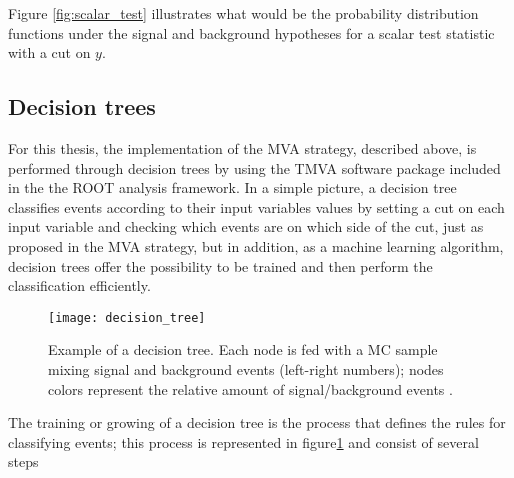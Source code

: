 Figure \ref{fig:scalar_test} illustrates what would be the probability distribution functions under the signal and background hypotheses for a scalar test statistic with a cut on $y$.

\subsection{Decision trees }

For this thesis, the implementation of the MVA strategy, described above, is performed through decision trees by using the TMVA software package \cite{tmva} included in the the ROOT analysis framework\cite{root}. In a simple picture, a decision tree classifies events according to their input variables values by setting a cut on each input variable and checking which events are on which side of the cut, just as proposed in the MVA strategy, but in addition, as a machine learning algorithm, decision trees offer the possibility to be trained and then perform the classification efficiently.    

\begin{figure}[!h]
  \centering
  \texttt{[image: decision\_tree]}
  \caption[Decision tree.]{Example of a decision tree. Each node is fed with a MC sample mixing signal and background events (left-right numbers); nodes colors represent the relative amount of signal/background events \cite{luca}.}\label{fig:dt}
\end{figure}

The training or growing of a decision tree is the process that defines the rules for classifying events; this process is represented in figure\ref{fig:dt} and consist of several steps

